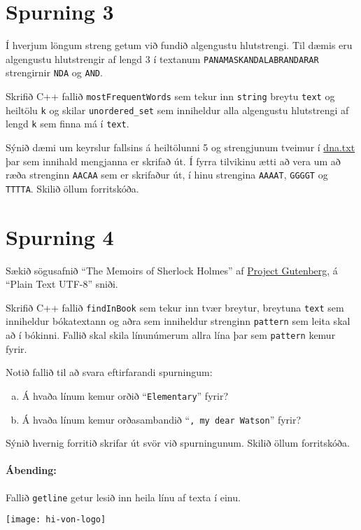 \documentclass{article}
\begin{document}
\section{Spurning 3}
Í hverjum löngum streng getum við fundið algengustu hlutstrengi. Til dæmis eru algengustu hlutstrengir af lengd 3 í textanum \texttt{PANAMASKANDALABRANDARAR} strengirnir \texttt{NDA} og \texttt{AND}.

Skrifið C++ fallið \texttt{mostFrequentWords} sem tekur inn \texttt{string} breytu \texttt{text} og heiltölu \texttt{k} og skilar \texttt{unordered\_set} sem inniheldur alla algengustu hlutstrengi af lengd \texttt{k} sem finna má í \texttt{text}.

Sýnið dæmi um keyrslur fallsins á heiltölunni 5 og strengjunum tveimur í \href{https://raw.githubusercontent.com/Ernir/kennsluefni/master/T2/Code/w3/dna.txt}{dna.txt} þar sem innihald mengjanna er skrifað út. Í fyrra tilvikinu ætti að vera um að ræða strenginn \texttt{AACAA} sem er skrifaður út, í hinu strengina \texttt{AAAAT}, \texttt{GGGGT} og \texttt{TTTTA}. Skilið öllum forritskóða.

\section{Spurning 4}
Sækið sögusafnið ``The Memoirs of Sherlock Holmes'' af \href{https://www.gutenberg.org/ebooks/834}{Project Gutenberg}, á ``Plain Text UTF-8'' sniði.

Skrifið C++ fallið \texttt{findInBook} sem tekur inn tvær breytur, breytuna \texttt{text} sem inniheldur bókatextann og aðra sem inniheldur strenginn \texttt{pattern} sem leita skal að í bókinni. Fallið skal skila línunúmerum allra lína þar sem \texttt{pattern} kemur fyrir.

Notið fallið til að svara eftirfarandi spurningum:

\begin{enumerate}[a)]
 \item Á hvaða línum kemur orðið ``\texttt{Elementary}'' fyrir?
 \item Á hvaða línum kemur orðasambandið ``\texttt{, my dear Watson}'' fyrir?
\end{enumerate}

Sýnið hvernig forritið skrifar út svör við spurningunum. Skilið öllum forritskóða.

\paragraph{Ábending:} Fallið \texttt{getline} getur lesið inn heila línu af texta í einu.

\vfill
\texttt{[image: hi-von-logo]}
\end{document}
